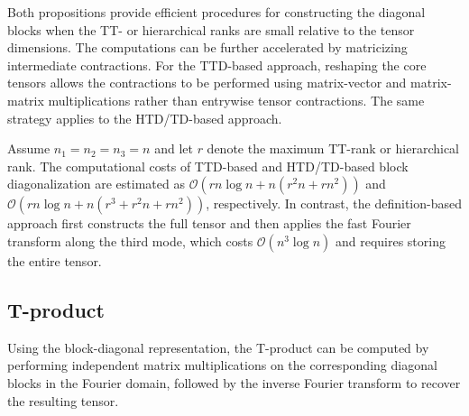 \documentclass[onefignum,onetabnum]{siamart250211}
\begin{document}

Both propositions provide efficient procedures for constructing the diagonal blocks when the TT- or hierarchical ranks are small relative to the tensor dimensions. The computations can be further accelerated by matricizing intermediate contractions. For the TTD-based approach, reshaping the core tensors allows the contractions to be performed using matrix-vector and matrix-matrix multiplications rather than entrywise tensor contractions. The same strategy applies to the HTD/TD-based approach.

\begin{remark}
    Assume $n_1 = n_2 = n_3 = n$ and let $r$ denote the maximum  TT-rank or hierarchical rank. The computational costs of TTD-based and HTD/TD-based block diagonalization  are estimated as $\mathcal{O}(rn \log n + n(r^2n  + rn^2))$ and $\mathcal{O}(rn\log n  + n(r^3 + r^2n  + rn^2))$, respectively. In contrast, the definition-based approach first constructs the full tensor and then applies the fast Fourier transform along the third mode, which costs $\mathcal{O}(n^3 \log n)$ and requires storing the entire tensor. 
\end{remark}


\subsection{T-product} Using the block-diagonal representation, the T-product can be computed by performing independent matrix multiplications on the corresponding diagonal blocks in the Fourier domain, followed by the inverse Fourier transform to recover the resulting tensor.
\end{document}

